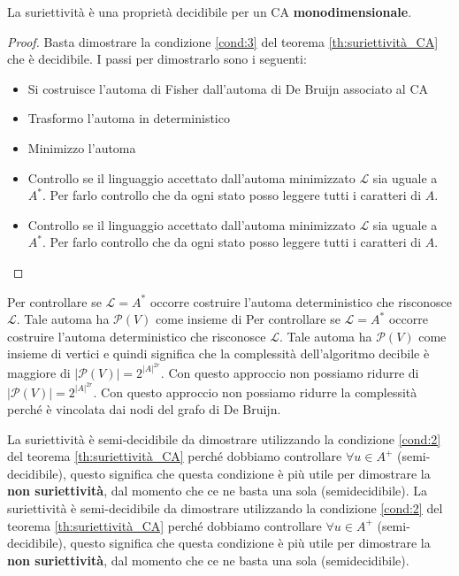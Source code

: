 \begin{teorema}
    La suriettività è una proprietà decidibile per un CA \textbf{monodimensionale}.
    \begin{proof}
        Basta dimostrare la condizione \ref{cond:3} del teorema \ref{th:suriettività_CA}
        che è decidibile. I passi per dimostrarlo sono i seguenti:
        \begin{itemize}
            \item Si costruisce l'automa di Fisher dall'automa di De Bruijn associato al CA
            \item Trasformo l'automa in deterministico
            \item Minimizzo l'automa
            \item Controllo se il linguaggio accettato dall'automa minimizzato $\mathcal{L}$ sia
                  uguale a $A^\ast$. Per farlo controllo che da ogni stato posso leggere
                  tutti i caratteri di $A$.
            \item Controllo se il linguaggio accettato dall'automa minimizzato $\mathcal{L}$ sia
                  uguale a $A^\ast$. Per farlo controllo che da ogni stato posso leggere
                  tutti i caratteri di $A$.
        \end{itemize}
    \end{proof}
\end{teorema}
\begin{nota}
    Per controllare se $\mathcal{L} = A^\ast$ occorre costruire l'automa deterministico
    che risconosce $ \mathcal{L}$. Tale automa ha $\mathcal{P}(V)$ come insieme di
    Per controllare se $\mathcal{L} = A^\ast$ occorre costruire l'automa deterministico
    che risconosce $ \mathcal{L}$. Tale automa ha $\mathcal{P}(V)$ come insieme di
    vertici e quindi significa che la complessità dell'algoritmo decibile è maggiore
    di $|\mathcal{P}(V)| = 2^{|A|^{2r}}$. Con questo approccio non possiamo ridurre
    di $|\mathcal{P}(V)| = 2^{|A|^{2r}}$. Con questo approccio non possiamo ridurre
    la complessità perché è vincolata dai nodi del grafo di De Bruijn.
\end{nota}

\begin{nota}
    La suriettività è semi-decidibile da dimostrare utilizzando la condizione \ref{cond:2}
    del teorema \ref{th:suriettività_CA} perché dobbiamo controllare $\forall u \in A^+$ (semi-decidibile),
    questo significa che questa condizione è più utile per dimostrare la \textbf{non
        suriettività}, dal momento che ce ne basta una sola (semidecidibile).
    La suriettività è semi-decidibile da dimostrare utilizzando la condizione \ref{cond:2}
    del teorema \ref{th:suriettività_CA} perché dobbiamo controllare $\forall u \in A^+$ (semi-decidibile),
    questo significa che questa condizione è più utile per dimostrare la \textbf{non
        suriettività}, dal momento che ce ne basta una sola (semidecidibile).
\end{nota}

